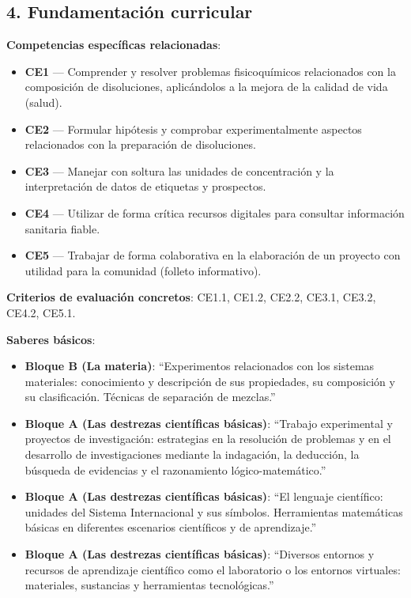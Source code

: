 \documentclass[11pt,a4paper]{article}
\begin{document}
\subsection*{4. Fundamentación curricular}
\textbf{Competencias específicas relacionadas}:
\begin{itemize}
    \item \textbf{CE1} --- Comprender y resolver problemas fisicoquímicos relacionados con la composición de disoluciones, aplicándolos a la mejora de la calidad de vida (salud).
    \item \textbf{CE2} --- Formular hipótesis y comprobar experimentalmente aspectos relacionados con la preparación de disoluciones.
    \item \textbf{CE3} --- Manejar con soltura las unidades de concentración y la interpretación de datos de etiquetas y prospectos.
    \item \textbf{CE4} --- Utilizar de forma crítica recursos digitales para consultar información sanitaria fiable.
    \item \textbf{CE5} --- Trabajar de forma colaborativa en la elaboración de un proyecto con utilidad para la comunidad (folleto informativo).
\end{itemize}

\textbf{Criterios de evaluación concretos}: CE1.1, CE1.2, CE2.2, CE3.1, CE3.2, CE4.2, CE5.1.

\textbf{Saberes básicos}:
\begin{itemize}
    \item \textbf{Bloque B (La materia)}: ``Experimentos relacionados con los sistemas materiales: conocimiento y descripción de sus propiedades, su composición y su clasificación. Técnicas de separación de mezclas.''
    \item \textbf{Bloque A (Las destrezas científicas básicas)}: ``Trabajo experimental y proyectos de investigación: estrategias en la resolución de problemas y en el desarrollo de investigaciones mediante la indagación, la deducción, la búsqueda de evidencias y el razonamiento lógico-matemático.''
    \item \textbf{Bloque A (Las destrezas científicas básicas)}: ``El lenguaje científico: unidades del Sistema Internacional y sus símbolos. Herramientas matemáticas básicas en diferentes escenarios científicos y de aprendizaje.''
    \item \textbf{Bloque A (Las destrezas científicas básicas)}: ``Diversos entornos y recursos de aprendizaje científico como el laboratorio o los entornos virtuales: materiales, sustancias y herramientas tecnológicas.''
\end{itemize}
\end{document}
